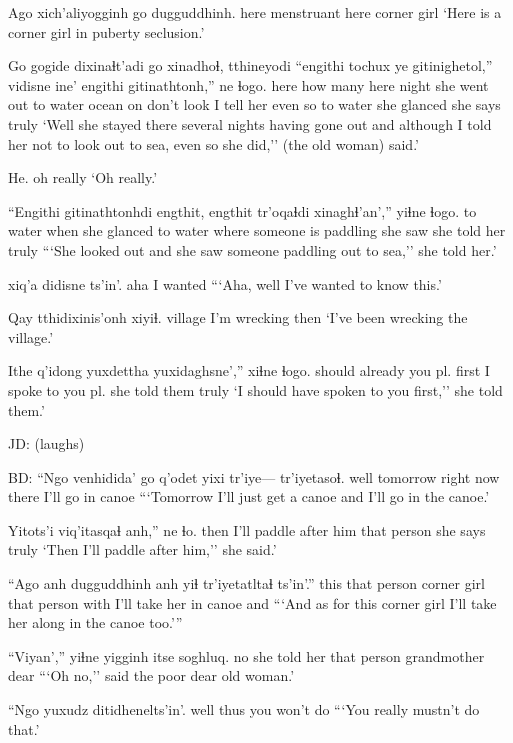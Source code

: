 \documentclass[12pt]{article}
\begin{document}
\gll Ago xich'aliyogginh go dugguddhinh. 
here menstruant here {corner girl}
\glt `Here is a corner girl in puberty seclusion.' 
\glend

\gll Go gogide dixinaɬt'adi go xinadhoɬ, tthineyodi ``engithi tochux ye gitinighetol,'' vidisne ine' engithi gitinathtonh,'' ne ɬogo.  
here {} {how many} here {night} {she went out} {to water} ocean on {don't look} {I tell her} {even so} {to water} {she glanced} {she says} truly
\glt `Well she stayed there several nights having gone out and although I told her not to look out to sea, even so she did,'' (the old woman) said.' 
\glend

\gll He.
{{oh really}}
\glt `Oh really.'
\glend

\gll ``Engithi gitinathtonhdi {engthit, engthit} tr'oqaɬdi xinaghɬ'an','' yiɬne ɬogo. 
{to water} {when she glanced} {to water} {where someone is paddling} {she saw} {she told her} truly
\glt ```She looked out and she saw someone paddling out to sea,'' she told her.' 
\glend

 {xiq'a didisne} ts'in'. 
aha {I wanted}
\glt ```Aha, well I've wanted to know this.' 
\glend

\gll Qay tthidixinis'onh xiyiɬ.
village  {I'm wrecking} then
\glt `I've been wrecking the village.' 
\glend

\gll Ithe q'idong yuxdettha yuxidaghsne','' xiɬne ɬogo. 
should already {you pl. first} {I spoke to you pl.} {she told them} truly
\glt `I should have spoken to you first,'' she told them.' 
\glend

JD:  (laughs)

BD:
\gll ``Ngo venhidida' {go q'odet} yixi tr'iye--- tr'iyetasoɬ. 
well tomorrow {right now} there {} {I'll go in canoe}
\glt ```Tomorrow I'll just get a canoe and I'll go in the canoe.' 
\glend

\gll Yitots'i {viq'itasqaɬ} anh,'' ne ɬo. 
then {I'll paddle after him} {that person} {she says} truly
\glt `Then I'll paddle after him,'' she said.' 
\glend

\gll ``Ago anh dugguddhinh anh yiɬ tr'iyetatltaɬ ts'in'.'' 
this {that person} {corner girl} {that person} {with} {I'll take her in canoe} and
\glt ```And as for this corner girl I'll take her along in the canoe too.''' 
\glend

\gll ``Viyan','' yiɬne yigginh itse soghluq. 
no {she told her} {that person} {grandmother} dear
\glt ```Oh no,'' said the poor dear old woman.' 
\glend

\gll ``Ngo yuxudz {ditidhenelts'in'}. 
well thus {you won't do}
\glt ```You really mustn't do that.' 
\glend
\end{document}
